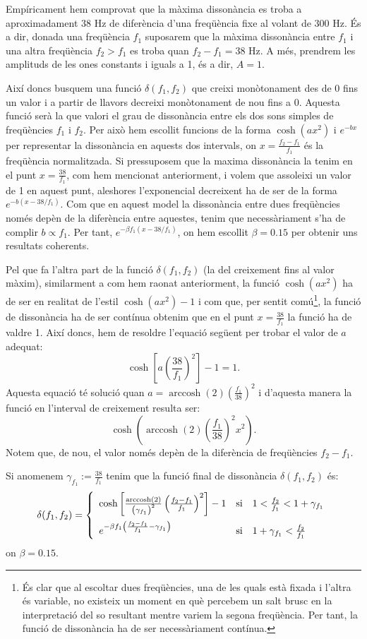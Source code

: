 \documentclass{article}
\theoremstyle{definition}
\newcommand{\0}{\ensuremath{\vb{0}}}
\DeclareMathOperator{\arccosh}{arccosh}
\begin{document}
Empíricament hem comprovat que la màxima dissonància es troba a aproximadament 38 Hz de diferència d'una freqüència fixe al volant de 300 Hz. És a dir, donada una freqüència $f_1$ suposarem que la màxima dissonància entre $f_1$ i una altra freqüència $f_2>f_1$ es troba quan $f_2-f_1=38\text{ Hz}$. A més, prendrem les amplituds de les ones constants i iguals a 1, és a dir, $A=1$.\par Així doncs busquem una funció $\delta(f_1,f_2)$ que creixi monòtonament des de 0 fins un valor i a partir de llavors decreixi monòtonament de nou fins a 0. Aquesta funció serà la que valori el grau de dissonància entre els dos sons simples de freqüències $f_1$ i $f_2$. Per això hem escollit funcions de la forma $\cosh\left(ax^2\right)$ i $e^{-bx}$ per representar la dissonància en aquests dos intervals, on $x=\frac{f_2-f_1}{f_1}$ és la freqüència normalitzada. Si pressuposem que la maxima dissonància la tenim en el punt $x=\frac{38}{f_1}$, com hem mencionat anteriorment, i volem que assoleixi un valor de 1 en aquest punt, aleshores l'exponencial decreixent ha de ser de la forma $e^{-b\left(x-38/f_1\right)}$. Com que en aquest model la dissonància entre dues freqüències només depèn de la diferència entre aquestes, tenim que necessàriament s'ha de complir $b\propto f_1$. Per tant, $e^{-\beta f_1(x-38/f_1)}$, on hem escollit $\beta=0.15$ per obtenir uns resultats coherents.\par Pel que fa l'altra part de la funció $\delta(f_1,f_2)$ (la del creixement fins al valor màxim), similarment a com hem raonat anteriorment, la funció $\cosh\left(ax^2\right)$ ha de ser en realitat de l'estil $\cosh\left(ax^2\right)-1$ i com que, per sentit comú\footnote{És clar que al escoltar dues freqüències, una de les quals està fixada i l'altra és variable, no existeix un moment en què percebem un salt brusc en la interpretació del so resultant mentre variem la segona freqüència. Per tant, la funció de dissonància ha de ser necessàriament contínua.}, la funció de dissonància ha de ser contínua obtenim que en el punt $x=\frac{38}{f_1}$ la funció ha de valdre 1. Així doncs, hem de resoldre l'equació següent per trobar el valor de $a$ adequat:
$$\cosh\left[a\left(\frac{38}{f_1}\right)^2\right]-1=1.$$ Aquesta equació té solució quan $a=\arccosh(2)\left(\frac{f_1}{38}\right)^2$ i d'aquesta manera la funció en l'interval de creixement resulta ser: $$\cosh\left(\arccosh(2)\left(\frac{f_1}{38}\right)^2x^2\right).$$ Notem que, de nou, el valor només depèn de la diferència de freqüències $f_2-f_1$.\par Si anomenem $\gamma_{f_1}:=\frac{38}{f_1}$ tenim que la funció final de dissonància $\delta(f_1,f_2)$ és: $$\delta(f_1,f_2)=
    \left\{\begin{array}{lll}
        \cosh\left[\frac{\arccosh(2)}{\left(\gamma_{f_1}\right)^2}\left(\frac{f_2-f_1}{f_1}\right)^2\right]-1 & \text{si} & 1<\frac{f_2}{f_1}<1+\gamma_{f_1}\vspace{5pt}\\
        e^{-\beta f_1\left(\frac{f_2-f_1}{f_1}-\gamma_{f_1}\right)} & \text{si} & 1+\gamma_{f_1}<\frac{f_2}{f_1}
    \end{array}\right.$$ on $\beta=0.15$.
\end{document}
